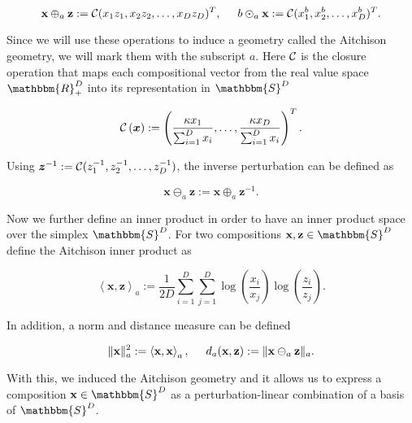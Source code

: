 \begin{equation}
\textbf{x}\oplus_a \textbf{z} := \mathcal{C}(x_1z_1,x_2z_2,\ldots,x_Dz_D)^T, \hspace{0.5cm} b \odot_a \textbf{x} := \mathcal{C}(x_1^b,x_2^b,\ldots,x_D^b)^T.
\label{eq:Simplex Operationen}
\end{equation}

Since we will use these operations to induce a geometry called the Aitchison geometry, we will mark them with the subscript $a$. Here $\mathcal{C}$ is the closure operation that maps each compositional vector from the real value space $\mathbbm{R}_+^D$ into its representation in $\mathbbm{S}^D$

\begin{equation}
\mathcal{C} \left(\bm{x}\right) := \left(\frac{\kappa x_1}{\sum_{i=1}^D x_i},\ldots, \frac{\kappa x_D}{\sum_{i=1}^D x_i}\right)^T.
\label{eq:Closure Operation}
\end{equation}


Using $\bm{z}^{-1} := \mathcal{C}(z_1^{-1},z_2^{-1},\ldots,z_D^{-1})$, the inverse perturbation can be defined as 

\begin{equation}
\textbf{x} \ominus_a \textbf{z} := \textbf{x} \oplus_a \textbf{z}^{-1}.
\label{eq: Inverse Perturbation}
\end{equation}

Now we further define an inner product in order to have an inner product space over the simplex $\mathbbm{S}^D$. For two compositions $\textbf{x},\textbf{z} \in \mathbbm{S}^D$ define the Aitchison inner product as 

\begin{equation}
\left\langle \textbf{x},\textbf{z} \right\rangle_a := \frac{1}{2D}\sum_{i=1}^{D}\sum_{j=1}^{D}\log(\frac{x_i}{x_j})\log(\frac{z_i}{z_j}).
\label{eq:Aitchon inner product}
\end{equation}

In addition, a norm and distance measure can be defined

\begin{equation}
\lVert\textbf{x}\rVert_a^2 := \left\langle  \textbf{x},\textbf{x} \right\rangle_a, \hspace{0.5cm} d_a(\textbf{x},\textbf{z}) := \lVert\textbf{x} \ominus_a \textbf{z}\rVert_a.
\label{eq:Simplex Norm and Distance}
\end{equation}

With this, we induced the Aitchison geometry and it allows us to express a composition $\textbf{x} \in \mathbbm{S}^D$ as a perturbation-linear combination of a basis of $\mathbbm{S}^D$.

